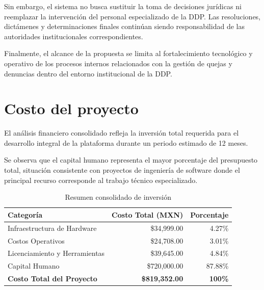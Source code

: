 Sin embargo, el sistema no busca sustituir la toma de decisiones jurídicas ni reemplazar la intervención del personal especializado de la DDP. Las resoluciones, dictámenes y determinaciones finales continúan siendo responsabilidad de las autoridades institucionales correspondientes.

Finalmente, el alcance de la propuesta se limita al fortalecimiento tecnológico y operativo de los procesos internos relacionados con la gestión de quejas y denuncias dentro del entorno institucional de la DDP.



\section{Costo del proyecto}

El análisis financiero consolidado refleja la inversión total requerida para el desarrollo integral de la plataforma durante un periodo estimado de 12 meses.

Se observa que el capital humano representa el mayor porcentaje del presupuesto total, situación consistente con proyectos de ingeniería de software donde el principal recurso corresponde al trabajo técnico especializado.

\begin{table}[H]
\centering
\caption{Resumen consolidado de inversión}

\begin{tabular}{lrr}
\toprule
\rowcolor{headerblue}
\textbf{Categoría} & \textbf{Costo Total (MXN)} & \textbf{Porcentaje} \\
\midrule

Infraestructura de Hardware &
\$34,999.00 &
4.27\% \\

Costos Operativos &
\$24,708.00 &
3.01\% \\

Licenciamiento y Herramientas &
\$39,645.00 &
4.84\% \\

Capital Humano &
\$720,000.00 &
87.88\% \\

\midrule
\textbf{Costo Total del Proyecto} &
\textbf{\$819,352.00} &
\textbf{100\%} \\

\bottomrule
\end{tabular}
\end{table}

\vspace{0.5cm}

